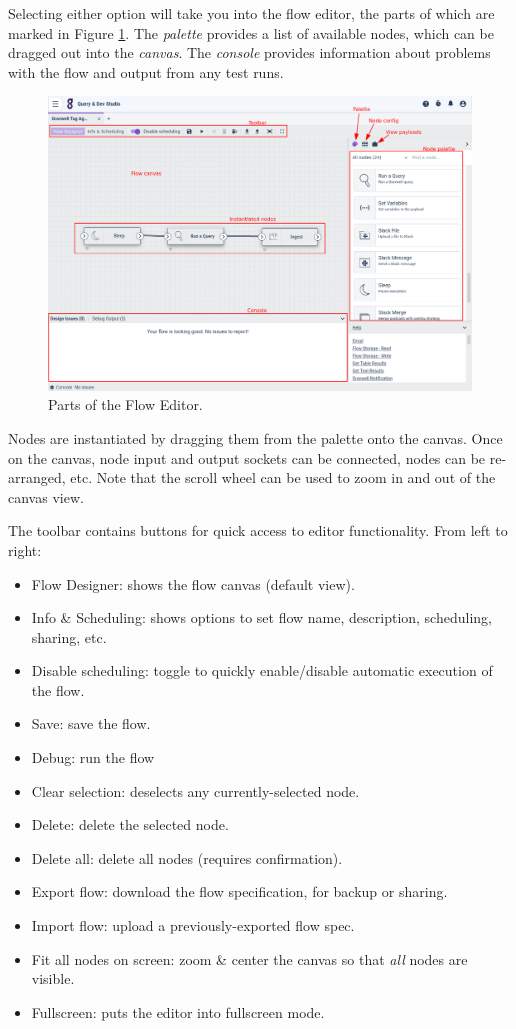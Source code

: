 Selecting either option will take you into the flow editor, the parts of which are marked in Figure \ref{fig:flow-editor}. The \emph{palette} provides a list of available nodes, which can be dragged out into the \emph{canvas}. The \emph{console} provides information about problems with the flow and output from any test runs.

\begin{figure}
	\includegraphics[width=0.85\linewidth]{images/flow-editor.png}
	\caption{Parts of the Flow Editor.}
	\label{fig:flow-editor}
\end{figure}

Nodes are instantiated by dragging them from the palette onto the canvas. Once on the canvas, node input and output sockets can be connected, nodes can be re-arranged, etc. Note that the scroll wheel can be used to zoom in and out of the canvas view.

The toolbar contains buttons for quick access to editor functionality. From left to right:

\begin{itemize}
\item Flow Designer: shows the flow canvas (default view).
\item Info \& Scheduling: shows options to set flow name, description, scheduling, sharing, etc.
\item Disable scheduling: toggle to quickly enable/disable automatic execution of the flow.
\item Save: save the flow.
\item Debug: run the flow
\item Clear selection: deselects any currently-selected node.
\item Delete: delete the selected node.
\item Delete all: delete all nodes (requires confirmation).
\item Export flow: download the flow specification, for backup or sharing.
\item Import flow: upload a previously-exported flow spec.
\item Fit all nodes on screen: zoom \& center the canvas so that \emph{all} nodes are visible.
\item Fullscreen: puts the editor into fullscreen mode.
\end{itemize}


